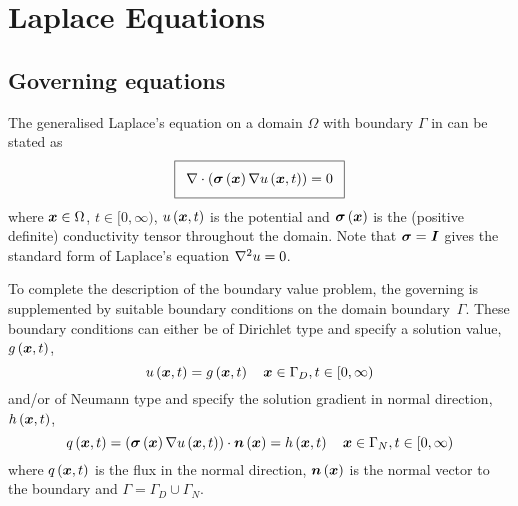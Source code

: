 \section{Laplace Equations}
\label{sec:LaplaceEquations}


\subsection{Governing equations}

The generalised Laplace's equation on a domain $\Omega$ with boundary $\Gamma$
in \OpenCMISS can be stated as
\begin{equation}
  \addtolength{\fboxsep}{5pt}
  \boxed{
    \divergence{}{\pbrac{\fnof{\tensor{\sigma}}{\vectr{x}}\gradient{}{\fnof{u}{\vectr{x},t}}}}=0
  }
  \label{eqn:GeneralisedLaplaceEquation}
\end{equation}
where $ \boldsymbol{x} \in\Omega$, $t\in[0,\infty)$, $ u\left(  \boldsymbol{x} ,t \right) $ is the potential and 
$ \boldsymbol{\mathit{\sigma}}\left(  \boldsymbol{x}  \right) $ is the (positive definite) conductivity
tensor throughout the domain. Note that $\boldsymbol{\mathit{\sigma}}=\boldsymbol{\mathit{I}}$ gives 
the standard form of Laplace's equation \ie $\laplacian{}{u}=0$.

To complete the description of the boundary value problem,
the governing  is supplemented
by suitable boundary conditions on the domain boundary~$\Gamma$.
These boundary conditions can either be of Dirichlet type and specify a
solution value, $ g\left(  \boldsymbol{x} ,t \right) $, \ie
\begin{equation}
  \fnof{u}{\vectr{x},t} = \fnof{g}{\vectr{x},t} \quad \vectr{x}\in\Gamma_{D},t\in[0,\infty)
  \label{eqn:LaplaceDirichletBC} 
\end{equation}
and/or of Neumann type and specify the solution gradient in normal direction,
$ h\left(  \boldsymbol{x} ,t \right) $, \ie
\begin{equation}
  \fnof{q}{\vectr{x},t} = \dotprod{\pbrac{\fnof{\tensor{\sigma}}{\vectr{x}}
      \gradient{}{\fnof{u}{\vectr{x},t}}}}{\fnof{\normal}{\vectr{x}}} =
  \fnof{h}{\vectr{x},t} \quad \vectr{x}\in\Gamma_{N},t\in[0,\infty)
  \label{eqn:LaplaceNeumannBC} 
\end{equation}
where $ q\left(  \boldsymbol{x} ,t \right) $ is the flux in the normal direction, $  \boldsymbol{n} \left(  \boldsymbol{x}  \right) $ is the normal
vector to the boundary and $\Gamma = \Gamma_D \cup \Gamma_N$.

